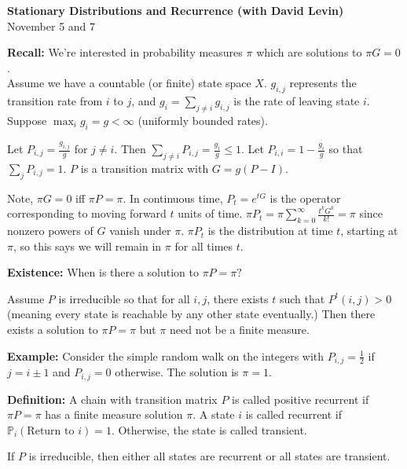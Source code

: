 \documentclass[../../../Master/AppliedStochastics.tex]{subfiles}
\author{Eli}  %
\date{November 5 and 7}    %
\newcommand{\I}{\infty}
\newcommand{\PP}{{\mathbb{P}}}
\begin{document}
\center \textbf{Stationary Distributions and Recurrence (with David Levin)} \\
November 5 and 7
\vspace{5mm}
\flushleft

\textbf{Recall:} We're interested in probability measures $\pi$ which are solutions to $\pi G=0$. \\


\vspace{5mm}
Assume we have a countable (or finite) state space $X$. $g_{i,j}$ represents the transition rate from $i$ to $j$, and $g_i=\sum_{j\neq i}g_{i,j}$ is the rate of leaving state $i$. Suppose $\max_ig_i=g<\I$ (uniformly bounded rates).  

\vspace{5mm}
Let $P_{i,j}=\frac{g_{i,j}}{g}$ for $j\neq i$. Then $\sum_{j\neq i}P_{i,j}=\frac{g_i}{g}\leq 1$. Let $P_{i,i}=1-\frac{g_i}{g}$ so that $\sum_j P_{i,j}=1$. $P$ is a transition matrix with $G=g(P-I)$.

\vspace{5mm}
Note, $\pi G=0$ iff $\pi P=\pi$. In continuous time, $P_t=e^{tG}$ is the operator corresponding to moving forward $t$ units of time. $\pi P_t=\pi\sum_{k=0}^\I\frac{t^kG^k}{k!}=\pi$ since nonzero powers of $G$ vanish under $\pi$. $\pi P_t$ is the distribution at time $t$, starting at $\pi$, so this says we will remain in $\pi$ for all times $t$.

\vspace{10mm}
\textbf{Existence:} When is there a solution to $\pi P=\pi?$

\vspace{5mm}
Assume $P$ is irreducible so that for all $i,j$, there exists $t$ such that $P^t(i,j)>0$ (meaning every state is reachable by any other state eventually.) Then there exists a solution to $\pi P=\pi$ but $\pi$ need not be a finite measure.

\vspace{5mm}
\textbf{Example:} Consider the simple random walk on the integers with $P_{i,j}=\frac{1}{2}$ if $j=i\pm 1$ and $P_{i,j}=0$ otherwise. The solution is $\pi=1$.

\vspace{5mm}
\textbf{Definition:} A chain with transition matrix $P$ is called positive recurrent if $\pi P=\pi$ has a finite measure solution $\pi$. A state $i$ is called recurrent if $\PP_i(\text{Return to }i)=1$. Otherwise, the state is called transient. 

\vspace{5mm}
If $P$ is irreducible, then either all states are recurrent or all states are transient.
\end{document}
